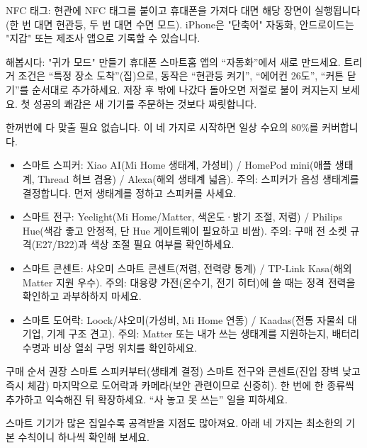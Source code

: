 NFC 태그: 현관에 NFC 태그를 붙이고 휴대폰을 가져다 대면 해당 장면이 실행됩니다(한 번 대면 현관등, 두 번 대면 수면 모드). iPhone은 "단축어" 자동화, 안드로이드는 "지갑" 또는 제조사 앱으로 기록할 수 있습니다.

\begin{tcbpractice}{해봅시다: "귀가 모드" 만들기}
휴대폰 스마트홈 앱의 “자동화”에서 새로 만드세요. 트리거 조건은 “특정 장소 도착”(집)으로, 동작은 “현관등 켜기”, “에어컨 26도”, “커튼 닫기”를 순서대로 추가하세요. 저장 후 밖에 나갔다 돌아오면 저절로 불이 켜지는지 보세요. 첫 성공의 쾌감은 새 기기를 주문하는 것보다 짜릿합니다.

\end{tcbpractice}


한꺼번에 다 맞출 필요 없습니다. 이 네 가지로 시작하면 일상 수요의 80\%를 커버합니다.

\begin{itemize}
  \item 스마트 스피커: Xiao AI(Mi Home 생태계, 가성비) / HomePod mini(애플 생태계, Thread 허브 겸용) / Alexa(해외 생태계 넓음). 주의: 스피커가 음성 생태계를 결정합니다. 먼저 생태계를 정하고 스피커를 사세요.
  \item 스마트 전구: Yeelight(Mi Home/Matter, 색온도·밝기 조절, 저렴) / Philips Hue(색감 좋고 안정적, 단 Hue 게이트웨이 필요하고 비쌈). 주의: 구매 전 소켓 규격(E27/B22)과 색상 조절 필요 여부를 확인하세요.
  \item 스마트 콘센트: 샤오미 스마트 콘센트(저렴, 전력량 통계) / TP-Link Kasa(해외 Matter 지원 우수). 주의: 대용량 가전(온수기, 전기 히터)에 쓸 때는 정격 전력을 확인하고 과부하하지 마세요.
  \item 스마트 도어락: Loock/샤오미(가성비, Mi Home 연동) / Kaadas(전통 자물쇠 대기업, 기계 구조 견고). 주의: Matter 또는 내가 쓰는 생태계를 지원하는지, 배터리 수명과 비상 열쇠 구멍 위치를 확인하세요.
\end{itemize}

\begin{tcbinfo}{구매 순서 권장}
스마트 스피커부터(생태계 결정) 스마트 전구와 콘센트(진입 장벽 낮고 즉시 체감) 마지막으로 도어락과 카메라(보안 관련이므로 신중히). 한 번에 한 종류씩 추가하고 익숙해진 뒤 확장하세요. “사 놓고 못 쓰는” 일을 피하세요.

\end{tcbinfo}


스마트 기기가 많은 집일수록 공격받을 지점도 많아져요. 아래 네 가지는 최소한의 기본 수칙이니 하나씩 확인해 보세요.

